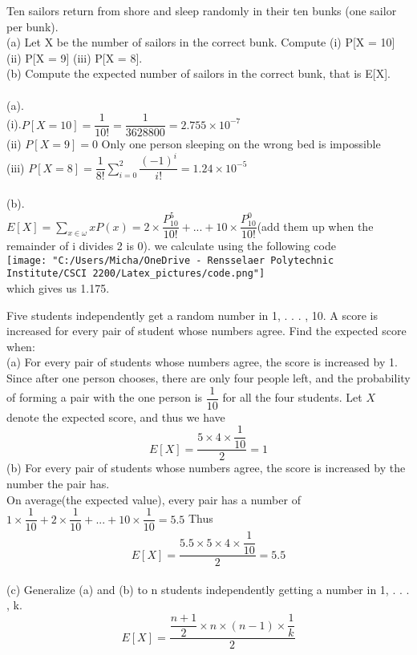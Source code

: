 \documentclass{article}
\begin{document}
\clearpage

\begin{addmargin}[2em]{2em}
	 Ten sailors return from shore and sleep randomly in their ten bunks (one sailor per bunk).\\
	(a) Let X be the number of sailors in the correct bunk. Compute (i) P[X = 10] (ii) P[X = 9] (iii) P[X = 8].\\
	(b) Compute the expected number of sailors in the correct bunk, that is E[X].\\\\
	(a). \\(i).$P[X = 10] = \dfrac{1}{10!} = \dfrac{1}{3628800} = 2.755 \times 10^{-7}$\\
	(ii) $P[X = 9] = 0$ Only one person sleeping on the wrong bed is impossible\\
	(iii) $P[X = 8] = \dfrac{1}{8!} \sum_{i=0}^{2} \dfrac{(-1)^i}{i!} =  1.24 \times 10^{-5}$\\\\
	(b). \\
	$E[X] = \sum_{x \in \omega} xP(x) = 2 \times \dfrac{P_{10}^5}{10!}+...+10 \times \dfrac{P_{10}^0}{10!}$(add them up when the remainder of i divides 2 is 0). we calculate using the following code\\
	\texttt{[image: "C:/Users/Micha/OneDrive - Rensselaer Polytechnic Institute/CSCI 2200/Latex\_pictures/code.png"]}\\
	which gives us 1.175.
\end{addmargin}
\clearpage
\begin{addmargin}[2em]{2em}
	 Five students independently get a random number in {1, . . . , 10}. A score is increased for every
	pair of student whose numbers agree. Find the expected score when:\\
	(a) For every pair of students whose numbers agree, the score is increased by 1.\\
	 Since after one person chooses, there are only four people left, and the probability of forming a pair with the one person is $\dfrac{1}{10}$ for all the four students. Let $X$ denote the expected score, and thus we have 
	 $$E[X] = \dfrac{5 \times 4 \times \dfrac{1}{10}}{2} = 1$$
	(b) For every pair of students whose numbers agree, the score is increased by the number the pair has.\\
		On average(the expected value), every pair has a number of $1 \times \dfrac{1}{10} + 2 \times \dfrac{1}{10} + ... + 10 \times \dfrac{1}{10} = 5.5 $ Thus $$E[X] = \dfrac{5.5 \times 5 \times 4 \times \dfrac{1}{10}}{2} = 5.5$$ \\
	(c) Generalize (a) and (b) to n students independently getting a number in {1, . . . , k}.\\
		$$E[X] = \dfrac{\dfrac{n+1}{2} \times n \times (n-1) \times \dfrac{1}{k}}{2}$$
\end{addmargin}
\end{document}

